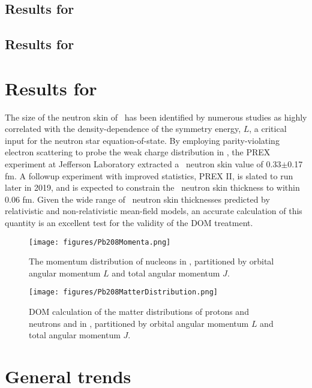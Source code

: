 \subsection{Results for \snTwelve}
\subsection{Results for \snFour}

\section{Results for \pbEight}
The size of the neutron skin of \pbEight\ has been identified by numerous studies as highly
correlated with the density-dependence of the symmetry energy, $L$, a critical input for the neutron
star equation-of-state. By employing parity-violating electron scattering to probe the
weak charge distribution in \pbEight, the PREX experiment at Jefferson Laboratory extracted a
\pbEight\ neutron skin value of 0.33$\pm$0.17 fm. A followup experiment with improved statistics, PREX II,
is slated to run later in 2019, and is expected to constrain the \pbEight\ neutron skin thickness to
within 0.06 fm. Given the wide range of \pbEight\ neutron skin thicknesses predicted by relativistic
and non-relativistic mean-field models, an accurate calculation of this quantity is an excellent
test for the validity of the DOM treatment.

\begin{figure}[tb]
    \centering
    \texttt{[image: figures/Pb208Momenta.png]}
    \caption[The single-particle momentum distributions in \pbEight]
    {
        The momentum distribution of nucleons in \pbEight, partitioned
        by orbital angular momentum $L$ and total angular momentum $J$.
    }
    \label{Pb208Momenta}
\end{figure}

\begin{figure}[tb]
    \centering
    \texttt{[image: figures/Pb208MatterDistribution.png]}
    \caption[The proton and neutron point distributions in \pbEight]
    {
        DOM calculation of the matter distributions of protons and neutrons and in \pbEight,
        partitioned by orbital angular momentum $L$ and total angular momentum $J$.
    }
    \label{Pb208MatterDistribution}
\end{figure}

\section{General trends}
